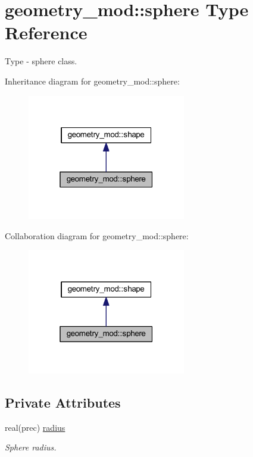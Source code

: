\hypertarget{structgeometry__mod_1_1sphere}{}\section{geometry\+\_\+mod\+:\+:sphere Type Reference}
\label{structgeometry__mod_1_1sphere}


Type -\/ sphere class.  




Inheritance diagram for geometry\+\_\+mod\+:\+:sphere\+:\nopagebreak
\begin{figure}[H]
\begin{center}
\leavevmode
\includegraphics[width=196pt]{structgeometry__mod_1_1sphere__inherit__graph}
\end{center}
\end{figure}


Collaboration diagram for geometry\+\_\+mod\+:\+:sphere\+:\nopagebreak
\begin{figure}[H]
\begin{center}
\leavevmode
\includegraphics[width=196pt]{structgeometry__mod_1_1sphere__coll__graph}
\end{center}
\end{figure}
\subsection*{Private Attributes}
\begin{DoxyCompactItemize}
\item 
real(prec) \hyperlink{structgeometry__mod_1_1sphere_aea9381f351c3670047fb7a779ef44fd7}{radius}
\begin{DoxyCompactList}\small\item\em Sphere radius. \end{DoxyCompactList}\end{DoxyCompactItemize}


